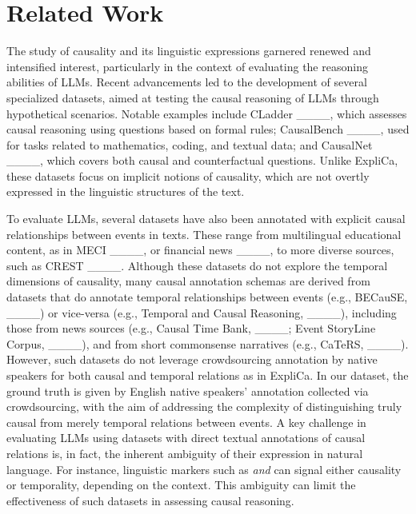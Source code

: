 \section{Related Work}
\label{related_work}

The study of causality and its linguistic expressions garnered renewed and intensified interest, particularly in the context of evaluating the reasoning abilities of LLMs. Recent advancements led to the development of several specialized datasets, aimed at testing the causal reasoning of LLMs through hypothetical scenarios. Notable examples include CLadder ____, which assesses causal reasoning using questions based on formal rules; CausalBench ____, used for tasks related to mathematics, coding, and textual data; and CausalNet ____, which covers both causal and counterfactual questions. Unlike ExpliCa, these datasets focus on implicit notions of causality, which are not overtly expressed in the linguistic structures of the text.

To evaluate LLMs, several datasets have also been annotated with explicit causal relationships between events in texts. 
These range from multilingual educational content, as in MECI ____, or financial news ____, to more diverse sources, such as CREST ____. Although these datasets do not explore the temporal dimensions of causality, many causal annotation schemas are derived from datasets that do annotate temporal relationships between events (e.g., BECauSE, ____) or vice-versa (e.g., Temporal and Causal Reasoning, ____), including those from news sources (e.g., Causal Time Bank, ____; Event StoryLine Corpus, ____), and from short commonsense narratives (e.g., CaTeRS, ____). However, such datasets do not leverage crowdsourcing annotation by native speakers for both causal and temporal relations as in ExpliCa. In our dataset, the ground truth is given by English native speakers' annotation collected via crowdsourcing, with the aim of addressing the complexity of distinguishing truly causal from merely temporal relations between events.
A key challenge in evaluating LLMs using datasets with direct textual annotations of causal relations is, in fact, the inherent ambiguity of their expression in natural language. For instance, linguistic markers such as \emph{and} can signal either causality or temporality, depending on the context. This ambiguity can limit the effectiveness of such datasets in assessing causal reasoning. 

